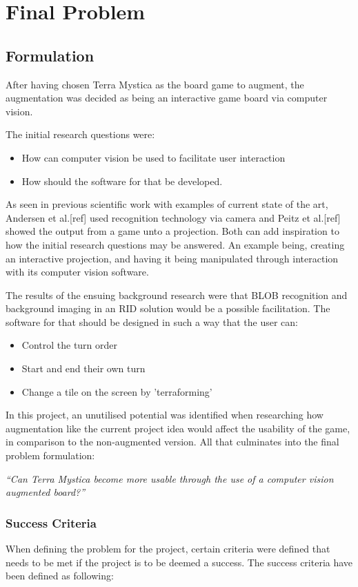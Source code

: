 \chapter{Final Problem}\label{ch:finprob}
\section{Formulation}
After having chosen Terra Mystica as the board game to augment, the augmentation was decided as being an interactive game board via computer vision.

The initial research questions were:
\begin{itemize}
	\item How can computer vision be used to facilitate user interaction 
	\item How should the software for that be developed.
\end{itemize}

As seen in previous scientific work with examples of current state of the art, Andersen et al.[ref] used recognition technology via camera and Peitz et al.[ref] showed the output from a game unto a projection. Both can add inspiration to how the initial research questions may be answered. An example being, creating an interactive projection, and having it being manipulated through interaction with its computer vision software.

The results of the ensuing background research were that BLOB recognition and background imaging in an RID solution would be a possible facilitation.
The software for that should be designed in such a way that the user can:
\begin{itemize}
\item Control the turn order
\item Start and end their own turn
\item Change a tile on the screen by 'terraforming'
\end{itemize}

In this project, an unutilised potential was identified when researching how augmentation like the current project idea would affect the usability of the game, in comparison to the non-augmented version. All that culminates into the final problem formulation:

\textit{“Can Terra Mystica become more usable through the use of a computer vision augmented board?”}

\subsection{Success Criteria}
When defining the problem for the project, certain criteria were defined that needs to be met if the project is to be deemed a success. The success criteria have been defined as following:

